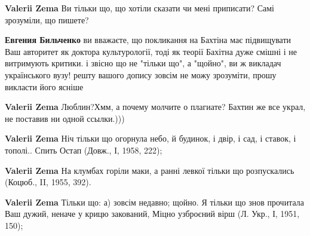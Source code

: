\begin{itemize}
\begin{itemize}
\textbf{Valerii Zema} Ви тільки що, що хотіли сказати чи мені приписати? Самі зрозуміли, що пишете?

 
\textbf{Евгения Бильченко} ви вважаєте, що покликання на Бахтіна має підвищувати Ваш авторитет як доктора культурології, тоді як теорії Бахітна дуже смішні і не витримують критики. і звісно що не "тільки що", а "щойно", ви ж викладач українського вузу! решту вашого допису зовсім не можу зрозуміти, прошу викласти його ясніше

 
\textbf{Valerii Zema} Люблин?Хмм, а почему молчите о плагиате? Бахтин же все украл, не поставив ни одной ссылки.)))

 
\textbf{Valerii Zema} Ніч тільки що огорнула небо, й будинок, і двір, і сад, і ставок, і тополі.. Спить Остап (Довж., І, 1958, 222);

 
\textbf{Valerii Zema} На клумбах горіли маки, а ранні левкої тільки що розпускались (Коцюб., II, 1955, 392).

 
\textbf{Valerii Zema} Тільки що: а) зовсім недавно; щойно. Я тільки що знов прочитала Ваш дужий, неначе у крицю закований, Міцно узброєний вірш (Л. Укр., І, 1951, 150);

 

\end{itemize}
\end{itemize}
